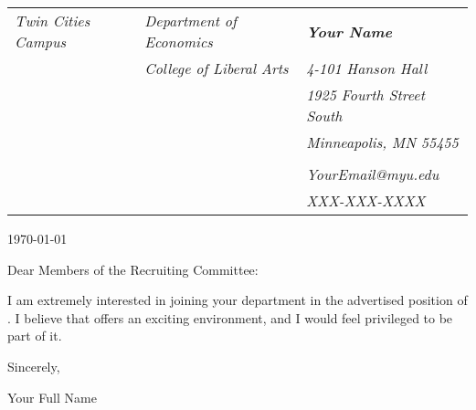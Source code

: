 \documentclass[11pt,english]{article}
\makeatletter
\providecommand{\tabularnewline}{\\}
\newcommand\skipblank{\@ifstar\@spskip\@nlskip}
\newcommand\@nlskip[1]{\ifthenelse{\DTLiseq{#1}{}}{\relax}{#1\\}}
\newcommand\@spskip[1]{\ifthenelse{\DTLiseq{#1}{}}{\relax}{#1\space}}
\makeatother
\begin{document}
    
    {%
    
    \thispagestyle{fancy}
    \begin{changemargin}{-0.0em}{-0.0em}
    \begin{tabular*}{17.7cm}{@{\extracolsep{\fill}}lll}

    \footnotesize \emph{Twin Cities Campus} & \footnotesize \emph{Department of Economics} &  \footnotesize \textbf{\emph{Your Name}}\tabularnewline [-.4em]
     & \footnotesize \emph{College of Liberal Arts} & \footnotesize \emph{4-101 Hanson Hall}\tabularnewline [-.4em] 
     &  & \footnotesize \emph{1925 Fourth Street South}\tabularnewline [-.4em]
     &  & \footnotesize \emph{Minneapolis, MN 55455}\tabularnewline [-.4em]
     &  & \tabularnewline [-.4em]
     &  & \footnotesize \emph{YourEmail@myu.edu}\tabularnewline [-.4em]
     &  & \footnotesize \emph{XXX-XXX-XXXX}
    \end{tabular*}
    \end{changemargin}    
    

\justify
\today

\justify
\skipblank{\institution}
\skipblank{\dept}
\vspace{0.5cm}
\justify   
Dear Members of the Recruiting Committee:

\justify
I am extremely interested in joining your department in the advertised position of \position. I believe that \institution   \thinspace offers an exciting environment, and I would feel privileged to be part of it. 

	\vspace{3cm}
	\hspace{13.6cm}
	 Sincerely,
		\vspace{-4mm}
	\begin{figure}[H]
	\hspace{13.5cm}
	\end{figure}
	\vspace{-9mm}
\hspace{13.6cm}  Your Full Name

\clearpage
}
\end{document}
